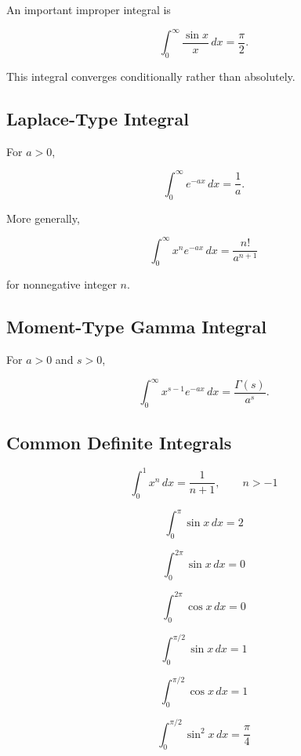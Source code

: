 An important improper integral is

\[
\boxed{
\int_0^\infty
\frac{
\sin x
}{
x
}
\,dx
=
\frac{\pi}{2}.
}
\]

This integral converges conditionally rather than absolutely.

\subsection{Laplace-Type Integral}
\label{subsec:laplace-type-integral}

For \(a>0\),

\[
\boxed{
\int_0^\infty
e^{-ax}
\,dx
=
\frac1a.
}
\]

More generally,

\[
\boxed{
\int_0^\infty
x^n e^{-ax}
\,dx
=
\frac{
n!
}{
a^{n+1}
}
}
\]

for nonnegative integer \(n\).

\subsection{Moment-Type Gamma Integral}
\label{subsec:moment-gamma-integral}

For \(a>0\) and \(s>0\),

\[
\boxed{
\int_0^\infty
x^{s-1}e^{-ax}
\,dx
=
\frac{
\Gamma(s)
}{
a^s
}.
}
\]

\subsection{Common Definite Integrals}
\label{subsec:common-definite-integrals}

\[
\boxed{
\int_0^1 x^n\,dx
=
\frac{1}{n+1},
\qquad
n>-1
}
\]

\[
\boxed{
\int_0^\pi
\sin x\,dx
=
2
}
\]

\[
\boxed{
\int_0^{2\pi}
\sin x\,dx
=
0
}
\]

\[
\boxed{
\int_0^{2\pi}
\cos x\,dx
=
0
}
\]

\[
\boxed{
\int_0^{\pi/2}
\sin x\,dx
=
1
}
\]

\[
\boxed{
\int_0^{\pi/2}
\cos x\,dx
=
1
}
\]

\[
\boxed{
\int_0^{\pi/2}
\sin^2x\,dx
=
\frac{\pi}{4}
}
\]

